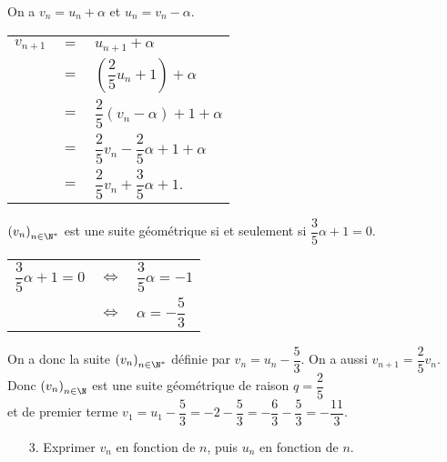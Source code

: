 \vspace*{.3cm}

On a $v_n = u_n + \alpha$ et $u_n = v_n - \alpha$. \\

\begin{tabular}{lll}
$v_{n+1}$ & $=$ & $u_{n+1} + \alpha$ \vspace*{.2cm} \\
& $=$ & $\left(\dfrac{2}{5}u_n + 1\right) + \alpha$ \vspace*{.2cm} \\
& $=$ & $\dfrac{2}{5}\left(v_n - \alpha\right) + 1 + \alpha$ \vspace*{.2cm} \\
& $=$ & $\dfrac{2}{5}v_n - \dfrac{2}{5}\alpha + 1 + \alpha$ \vspace*{.2cm} \\
& $=$ & $\dfrac{2}{5}v_n + \dfrac{3}{5}\alpha + 1$. \\
\end{tabular}

\vspace*{.1cm}

$\left(v_n\right)_{n \in \N^*}$ est une suite géométrique si et seulement si $\dfrac{3}{5} \alpha + 1 = 0$. \\

\begin{tabular}{lll}
$\dfrac{3}{5}\alpha + 1 = 0$ & $\Longleftrightarrow$ & $\dfrac{3}{5}\alpha = -1$ \\
& $\Longleftrightarrow$ & $\alpha = -\dfrac{5}{3}$ \\
\end{tabular}

On a donc la suite $\left(v_n\right)_{n \in \N^*}$ définie par $v_n = u_n - \dfrac{5}{3}$. On a aussi $v_{n+1} = \dfrac{2}{5}v_n$. \\

Donc $\left(v_n\right)_{n \in \N}$ est une suite géométrique de raison $q = \dfrac{2}{5}$ \vspace*{.1cm} \\ et de premier terme $v_1 = u_1 - \dfrac{5}{3} = -2 -\dfrac{5}{3} = -\dfrac{6}{3} - \dfrac{5}{3} = -\dfrac{11}{3}$. \\


\begin{itemize}
\item[3.] Exprimer $v_n$ en fonction de $n$, puis $u_n$ en fonction de $n$. \\
\end{itemize}

